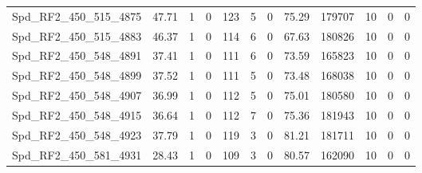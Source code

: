 \begin{longtable}[c]{@{}lrrrrrrrrrrr@{}}
Spd\_RF2\_450\_515\_4875      & 47.71                  & 1                       & 0                       & 123                    & 5                       & 0                       & 75.29                   & 179707                   & 10                       & 0                        & 0                        \\
Spd\_RF2\_450\_515\_4883      & 46.37                  & 1                       & 0                       & 114                    & 6                       & 0                       & 67.63                   & 180826                   & 10                       & 0                        & 0                        \\
Spd\_RF2\_450\_548\_4891      & 37.41                  & 1                       & 0                       & 111                    & 6                       & 0                       & 73.59                   & 165823                   & 10                       & 0                        & 0                        \\
Spd\_RF2\_450\_548\_4899      & 37.52                  & 1                       & 0                       & 111                    & 5                       & 0                       & 73.48                   & 168038                   & 10                       & 0                        & 0                        \\
Spd\_RF2\_450\_548\_4907      & 36.99                  & 1                       & 0                       & 112                    & 5                       & 0                       & 75.01                   & 180580                   & 10                       & 0                        & 0                        \\
Spd\_RF2\_450\_548\_4915      & 36.64                  & 1                       & 0                       & 112                    & 7                       & 0                       & 75.36                   & 181943                   & 10                       & 0                        & 0                        \\
Spd\_RF2\_450\_548\_4923      & 37.79                  & 1                       & 0                       & 119                    & 3                       & 0                       & 81.21                   & 181711                   & 10                       & 0                        & 0                        \\
Spd\_RF2\_450\_581\_4931      & 28.43                  & 1                       & 0                       & 109                    & 3                       & 0                       & 80.57                   & 162090                   & 10                       & 0                        & 0                        \\

\end{longtable}

